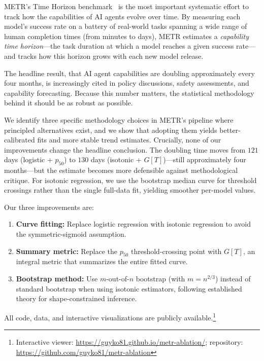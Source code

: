 \documentclass[11pt,a4paper]{article}
\begin{document}
METR's Time Horizon benchmark~\citep{metr2025} is the most important systematic effort to track how the capabilities of AI agents evolve over time.
By measuring each model's success rate on a battery of real-world tasks spanning a wide range of human completion times (from minutes to days), METR estimates a \emph{capability time horizon}---the task duration at which a model reaches a given success rate---and tracks how this horizon grows with each new model release.

The headline result, that AI agent capabilities are doubling approximately every four months, is increasingly cited in policy discussions, safety assessments, and capability forecasting.
Because this number matters, the statistical methodology behind it should be as robust as possible.

We identify three specific methodology choices in METR's pipeline where principled alternatives exist, and we show that adopting them yields better-calibrated fits and more stable trend estimates.
Crucially, none of our improvements change the headline conclusion.
The doubling time moves from $121$ days (logistic + $p_{50}$) to $130$ days (isotonic + $G[T]$)---still approximately four months---but the estimate becomes more defensible against methodological critique.
For isotonic regression, we use the bootstrap median curve for threshold crossings rather than the single full-data fit, yielding smoother per-model values.

Our three improvements are:
\begin{enumerate}
  \item \textbf{Curve fitting:} Replace logistic regression with isotonic regression to avoid the symmetric-sigmoid assumption.
  \item \textbf{Summary metric:} Replace the $p_{50}$ threshold-crossing point with $G[T]$, an integral metric that summarizes the entire fitted curve.
  \item \textbf{Bootstrap method:} Use $m$-out-of-$n$ bootstrap (with $m = n^{2/3}$) instead of standard bootstrap when using isotonic estimators, following established theory for shape-constrained inference.
\end{enumerate}

All code, data, and interactive visualizations are publicly available.\footnote{Interactive viewer: \url{https://guyko81.github.io/metr-ablation/}; repository: \url{https://github.com/guyko81/metr-ablation}}


\end{document}
